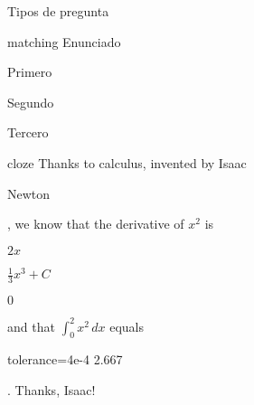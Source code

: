 \documentclass[10pt]{article}
\begin{document}
\begin{quiz}{Tipos de pregunta}
\begin{matching}[]%
    {matching} 
    Enunciado
    \item Primero 
    \item Segundo 
    \item Tercero 
\end{matching}

\begin{cloze}%
    {cloze} 
    Thanks to calculus, invented by Isaac 
    \begin{shortanswer}[usecase] 
        \item Newton 
    \end{shortanswer}, 
    we know that the derivative of $x^2$ is 
    \begin{multi}[] 
        \item $2x$ 
        \item* $\frac{1}{3} x^3 + C$ 
        \item $0$ 
    \end{multi}
    and that $\int_0^2 x^2\,dx$ equals 
    \begin{numerical} 
        \item[tolerance={4e-4}] 2.667 
    \end{numerical}. 
    Thanks, Isaac! 
\end{cloze}


\end{quiz}
\end{document}
